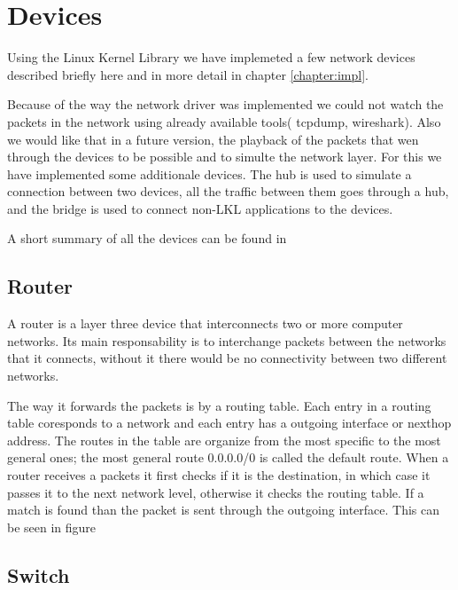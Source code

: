 
\section{Devices}
\label{sec:devices}

Using the Linux Kernel Library we have implemeted a few network devices described briefly
here and in more detail in chapter \ref{chapter:impl}.

Because of the way the network driver was implemented we could not watch the packets in the
network using already available tools( tcpdump, wireshark). Also we would like that in a future version,
the playback of the packets that wen through the devices to be possible and to simulte the network layer.
For this we have implemented some additionale devices. The hub is used to simulate a connection between 
two devices, all the traffic between them goes through a hub, and the bridge is used to connect non-LKL 
applications to the \text{\project} devices.

A short summary of all the devices can be found in 

\subsection{Router}
\label{sub-sec:router}

A router is a layer three device that interconnects two or more computer networks. Its main responsability
is to interchange packets between the networks that it connects, without it there would be no connectivity 
between two different networks.

The way it forwards the packets is by a routing table. Each entry in a routing table coresponds to a network
and each entry has a outgoing interface or nexthop address. The routes in the table are organize from the most specific
to the most general ones; the most general route 0.0.0.0/0 is called the default route. When a router receives a packets it 
first checks if it is the destination, in which case it passes it to the next network level, otherwise it checks the routing
table. If a match is found than the packet is sent through the outgoing interface. This can be seen in figure 


\subsection{Switch}
\label{sub-sec:switch}

